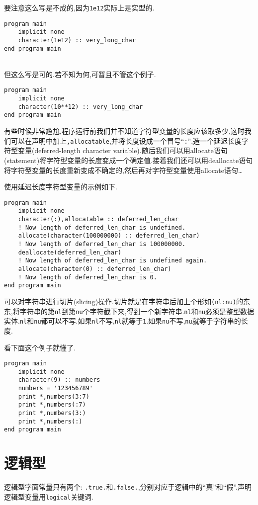 要注意这么写是不成的,因为\texttt{1e12}实际上是实型的.
\begin{lstlisting}
program main
    implicit none
    character(1e12) :: very_long_char
end program main
\end{lstlisting}\mbox{}\\
但这么写是可的.若不知为何,可暂且不管这个例子.
\begin{lstlisting}
program main
    implicit none
    character(10**12) :: very_long_char
end program main
\end{lstlisting}

有些时候非常尴尬,程序运行前我们并不知道字符型变量的长度应该取多少,这时我们可以在声明中加上\texttt{,allocatable},并将长度设成一个冒号``\texttt{:}'',造一个延迟长度字符型变量(deferred-length character variable).随后我们可以用allocate语句(statement)将字符型变量的长度变成一个确定值.接着我们还可以用deallocate语句将字符型变量的长度重新变成不确定的,然后再对字符型变量使用allocate语句\dots

使用延迟长度字符型变量的示例如下.
\begin{lstlisting}
program main
    implicit none
    character(:),allocatable :: deferred_len_char
    ! Now length of deferred_len_char is undefined.
    allocate(character(100000000) :: deferred_len_char)
    ! Now length of deferred_len_char is 100000000.
    deallocate(deferred_len_char)
    ! Now length of deferred_len_char is undefined again.
    allocate(character(0) :: deferred_len_char)
    ! Now length of deferred_len_char is 0.
end program main
\end{lstlisting}

可以对字符串进行切片(slicing)操作.切片就是在字符串后加上个形如\texttt{(nl:nu)}的东东,将字符串的第\texttt{nl}到第\texttt{nu}个字符截下来,得到一个新字符串.\texttt{nl}和\texttt{nu}必须是整型数据实体.\texttt{nl}和\texttt{nu}都可以不写.如果\texttt{nl}不写,\texttt{nl}就等于\texttt{1}.如果\texttt{nu}不写,\texttt{nu}就等于字符串的长度.

看下面这个例子就懂了.
\newpage
\begin{lstlisting}
program main
    implicit none
    character(9) :: numbers
    numbers = '123456789'
    print *,numbers(3:7)
    print *,numbers(:7)
    print *,numbers(3:)
    print *,numbers(:)
end program main
\end{lstlisting}

\section{逻辑型}

逻辑型字面常量只有两个: \texttt{.true.}和\texttt{.false.},分别对应于逻辑中的``真''和``假''.声明逻辑型变量用\texttt{logical}关键词.
